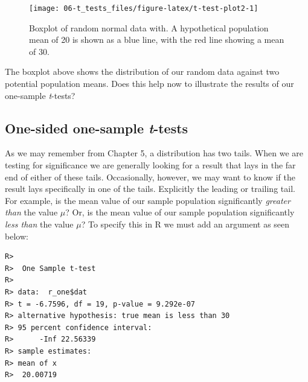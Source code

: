 \documentclass[english,10pt,a4paper,oneside]{book}
\newenvironment{Shaded}{\begin{snugshade}}{\end{snugshade}}
\newcommand{\KeywordTok}[1]{\textcolor[rgb]{0.13,0.29,0.53}{\textbf{#1}}}
\newcommand{\DataTypeTok}[1]{\textcolor[rgb]{0.13,0.29,0.53}{#1}}
\newcommand{\DecValTok}[1]{\textcolor[rgb]{0.00,0.00,0.81}{#1}}
\newcommand{\StringTok}[1]{\textcolor[rgb]{0.31,0.60,0.02}{#1}}
\newcommand{\CommentTok}[1]{\textcolor[rgb]{0.56,0.35,0.01}{\textit{#1}}}
\newcommand{\OperatorTok}[1]{\textcolor[rgb]{0.81,0.36,0.00}{\textbf{#1}}}
\newcommand{\NormalTok}[1]{#1}
\theoremstyle{definition}
\theoremstyle{definition}
\theoremstyle{definition}
\theoremstyle{remark}
\begin{document}
\begin{figure}
\texttt{[image: 06-t\_tests\_files/figure-latex/t-test-plot2-1]} \caption{Boxplot of random normal data with. A hypothetical population mean of 20 is shown as a blue line, with the red line showing a mean of 30.}\label{fig:t-test-plot2}
\end{figure}

The boxplot above shows the distribution of our random data against two
potential population means. Does this help now to illustrate the results
of our one-sample \emph{t}-tests?

\subsection{\texorpdfstring{One-sided one-sample
\emph{t}-tests}{One-sided one-sample t-tests}}\label{one-sided-one-sample-t-tests}

As we may remember from Chapter 5, a distribution has two tails. When we
are testing for significance we are generally looking for a result that
lays in the far end of either of these tails. Occasionally, however, we
may want to know if the result lays specifically in one of the tails.
Explicitly the leading or trailing tail. For example, is the mean value
of our sample population significantly \emph{greater than} the value
\(\mu\)? Or, is the mean value of our sample population significantly
\emph{less than} the value \(\mu\)? To specify this in R we must add an
argument as seen below:

\begin{Shaded}
\end{Shaded}

\begin{verbatim}
R> 
R>  One Sample t-test
R> 
R> data:  r_one$dat
R> t = -6.7596, df = 19, p-value = 9.292e-07
R> alternative hypothesis: true mean is less than 30
R> 95 percent confidence interval:
R>      -Inf 22.56339
R> sample estimates:
R> mean of x 
R>  20.00719
\end{verbatim}

\begin{Shaded}
\end{Shaded}
\end{document}
